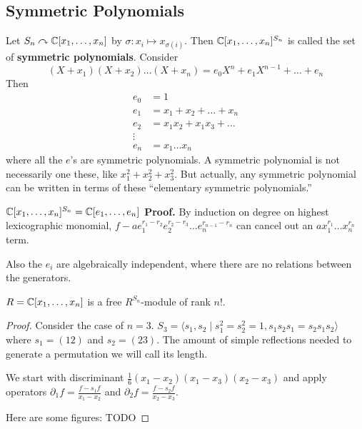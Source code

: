 \subsection{Symmetric Polynomials}
\begin{example}
    Let $S_n \curvearrowright \operatorname{\mathbb{C}}[x_1, \dots, x_n]$ by $\sigma: x_i \mapsto x_{\sigma(i)}$.
    Then $\operatorname{\mathbb{C}}[x_1, \dots, x_n]^{S_n}$ is called the set of \textbf{symmetric polynomials}.
    Consider
    \[(X+x_1)(X+x_2)\dots(X+x_n) = e_0 X^n + e_1 X^{n - 1} + \dots + e_n \]
    Then 
    \begin{align*}
        e_0 &= 1 \\
        e_1 &= x_1 + x_2 + \dots + x_n \\
        e_2 &= x_1 x_2 + x_1 x_3 + \dots \\
        \vdots& \\
        e_n &= x_1 \dots x_n
    \end{align*}
    where all the $e$'s are symmetric polynomials. A symmetric polynomial is not necessarily one these,
    like $x_1^2 + x_2^2 + x_3^2$. But actually, any symmetric polynomial
    can be written in terms of these ``elementary symmetric polynomials.''
\end{example}

\begin{theorem}
    $\operatorname{\mathbb{C}}[x_1, \dots, x_n]^{S_n} = \operatorname{\mathbb{C}}[e_1, \dots, e_n]$
    \textbf{Proof. } By induction on degree on highest lexicographic monomial, $f - ae_1^{r_1-r_2}e_2^{r_2-r_3}\dots e_n^{r_{n-1} - r_n}$
    can cancel out an $a x_1^{r_1} \dots x_n^{r_n}$ term.
\end{theorem}
Also the $e_i$ are algebraically independent, where there are no relations between the generators.

\begin{theorem}
    $R = \operatorname{\mathbb{C}}[x_1, \dots, x_n]$ is a free $R^{S_n}$-module of rank $n!$.
    \begin{proof}
        Consider the case of $n = 3$. $S_3 = \langle s_1, s_2 \mid s_1^2=s_2^2=1, s_1 s_2 s_1 = s_2 s_1 s_2 \rangle$
        where $s_1 = (1 2)$ and $s_2 = (2 3)$. The amount of simple reflections needed to generate a permutation
        we will call its length.
        
        We start with discriminant $\frac{1}{6}(x_1 - x_2)(x_1 - x_3)(x_2 - x_3)$
        and apply operators $\partial_1 f = \frac{f - s_1 f}{x_1 - x_2}$
        and $\partial_2 f = \frac{f - s_2 f}{x_2 - x_3}$.
        
        Here are some figures: TODO
    \end{proof}
\end{theorem}



